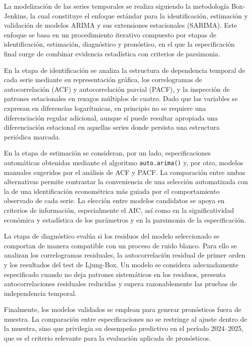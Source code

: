 \documentclass[11pt]{article}
\begin{document}
La modelización de las series temporales se realiza siguiendo la metodología Box-Jenkins, la cual constituye el enfoque estándar para la identificación, estimación y validación de modelos ARIMA y sus extensiones estacionales (SARIMA). Este enfoque se basa en un procedimiento iterativo compuesto por etapas de identificación, estimación, diagnóstico y pronóstico, en el que la especificación final surge de combinar evidencia estadística con criterios de parsimonia.

En la etapa de identificación se analiza la estructura de dependencia temporal de cada serie mediante su representación gráfica, los correlogramas de autocorrelación (ACF) y autocorrelación parcial (PACF), y la inspección de patrones estacionales en rezagos múltiplos de cuatro. Dado que las variables se expresan en diferencias logarítmicas, en principio no se requiere una diferenciación regular adicional, aunque sí puede resultar apropiada una diferenciación estacional en aquellas series donde persista una estructura periódica marcada.

En la etapa de estimación se consideran, por un lado, especificaciones automáticas obtenidas mediante el algoritmo \texttt{auto.arima()} y, por otro, modelos manuales sugeridos por el análisis de ACF y PACF. La comparación entre ambas alternativas permite contrastar la conveniencia de una selección automatizada con la de una identificación econométrica más guiada por el comportamiento observado de cada serie. La elección entre modelos candidatos se apoya en criterios de información, especialmente el AIC, así como en la significatividad económica y estadística de los parámetros y en la parsimonia de la especificación.

La etapa de diagnóstico evalúa si los residuos del modelo seleccionado se comportan de manera compatible con un proceso de ruido blanco. Para ello se analizan los correlogramas residuales, la autocorrelación residual de primer orden y los resultados del test de Ljung-Box. Un modelo se considera adecuadamente especificado cuando no deja patrones sistemáticos en los residuos, presenta autocorrelaciones residuales reducidas y supera razonablemente las pruebas de independencia temporal.

Finalmente, los modelos validados se emplean para generar pronósticos fuera de muestra. La comparación entre especificaciones no se restringe al ajuste dentro de la muestra, sino que privilegia su desempeño predictivo en el período 2024–2025, que es el criterio relevante para la evaluación aplicada de pronósticos.
\end{document}
